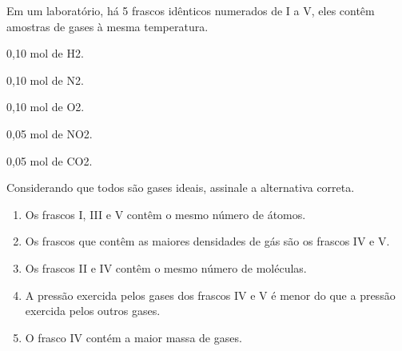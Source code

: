 Em um laboratório, há 5 frascos idênticos numerados de I a V, eles contêm amostras de gases à mesma temperatura.

\begin{enumerate*}[label =  \Roman*:]
	\item 0,10 mol de H2.
	\item 0,10 mol de N2.
	\item 0,10 mol de O2.
	\item 0,05 mol de NO2.
	\item 0,05 mol de CO2.
\end{enumerate*}

Considerando que todos são gases ideais, assinale a alternativa correta.

\begin{enumerate}[label = (\alph*)]
	
	\item Os frascos I, III e V contêm o mesmo número de átomos. 
	\item Os frascos que contêm as maiores densidades de gás são os frascos IV e V. 
	\item Os frascos II e IV contêm o mesmo número de moléculas. 
	\item A pressão exercida pelos gases dos frascos IV e V é menor do que a pressão exercida pelos outros gases. 
	\item  O frasco IV contém a maior massa de gases.
\end{enumerate}
